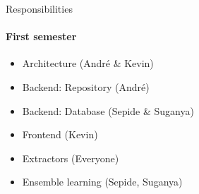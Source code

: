 \begin{frame}{Responsibilities}
\framesubtitle{First semester}
	\begin{itemize}
		\item Architecture (André \& Kevin)
		\item Backend: Repository (André)
		\item Backend: Database (Sepide \& Suganya)
		\item Frontend (Kevin)
		\item Extractors (Everyone)
		\item Ensemble learning  (Sepide, Suganya)
	\end{itemize}
\end{frame}